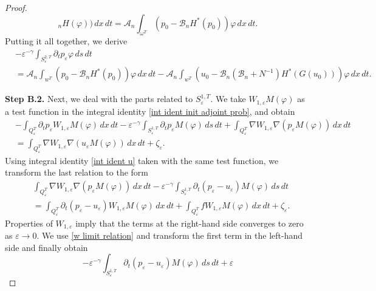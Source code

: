 \documentclass[10pt,a4paper]{amsart}
\numberwithin{equation}{section}
\begin{document}
\begin{proof}
\[_nH(\varphi ))\,dx\,dt=\mathcal{A}_n\int _{\omega ^{T}}(p_0-%
\mathcal{B}_nH^{\ast }(p_0))\varphi \,dx\,dt.
\]
Putting it all together, we derive
\begin{equation}
\begin{aligned}
&-\varepsilon ^{-\gamma }\int _{S_{\varepsilon }^{2,T}}\partial
_{t}p_{\varepsilon }\varphi \,ds\,dt \\
&=\mathcal{A}_n\int _{w^{T}}(p_0-%
\mathcal{B}_nH^{\ast }(p_0))\varphi \,dx\,dt
-\mathcal{A}_n\int _{w^{T}}(u_0-\mathcal{B}_n(\mathcal{B}%
_n+N^{-1})H^{\ast }(G(u_0)))\varphi \,dx\,dt.
\end{aligned}  \label{pa_t p cont}
\end{equation}

\noindent\textbf{Step B.2.}
Next, we deal with the parts related to $S_{\varepsilon}^{1,T}$. 
We take $W_{1,\varepsilon }M(\varphi )$ as a test function in the
integral identity \eqref{int ident init adjoint prob}, and obtain
\begin{align*}
&-\int _{Q_{\varepsilon }^{T}}\partial _{t}p_{\varepsilon
}W_{1,\varepsilon }M(\varphi )\,dx\,dt-\varepsilon ^{-\gamma }\int
_{S_{\varepsilon }^{1,T}}\partial _{t}p_{\varepsilon }M(\varphi ){\,ds\,dt%
}+\int _{Q_{\varepsilon }^{T}}\nabla W_{1,\varepsilon }\nabla
(p_{\varepsilon }M(\varphi ))\,dx\,dt \\
&=\int _{Q_{\varepsilon }^{T}}\nabla W_{1,\varepsilon }\nabla
(u_{\varepsilon }M(\varphi ))\,dx\,dt + \zeta _{\varepsilon }.
\end{align*}
Using integral identity \eqref{int ident u} taken with the same test
function, we transform the last relation to the form
\begin{align*}
&\int _{Q_{\varepsilon }^{T}}\nabla W_{1,\varepsilon }\nabla
(p_{\varepsilon }M(\varphi ))\,dx\,dt-\varepsilon ^{-\gamma }\int
_{S_{\varepsilon }^{1,T}}\partial _{t}(p_{\varepsilon
}-u_{\varepsilon })M(\varphi )\,ds\,dt \\
&=\int _{Q_{\varepsilon }^{T}}\partial _{t}(p_{\varepsilon
}-u_{\varepsilon })W_{1,\varepsilon }M(\varphi )\,dx\,dt+\int
_{Q_{\varepsilon }^{T}}fW_{1,\varepsilon }M(\varphi )\,dx\,dt+\zeta
_{\varepsilon }.
\end{align*}
Properties of $W_{1,\varepsilon }$ imply that the terms at the right-hand
side converges to zero as $\varepsilon \to 0$. We use
\eqref{w limit relation} and transform the first term in the left-hand side 
and finally obtain
\[
-\varepsilon ^{-\gamma }\int _{S_{\varepsilon }^{1,T}}\partial
_{t}(p_{\varepsilon }-u_{\varepsilon })M(\varphi )\,ds\,dt+\varepsilon
\]
\end{proof}
\end{document}

